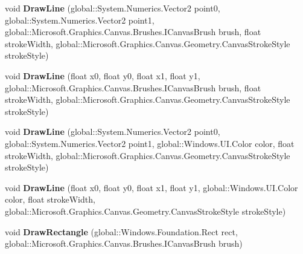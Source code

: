 \begin{DoxyCompactItemize}
\item 
\mbox{\label{interface_microsoft_1_1_graphics_1_1_canvas_1_1_i_canvas_drawing_session_a7127eba36145630ee36730eeffcc1427}} 
void {\bfseries Draw\+Line} (global\+::\+System.\+Numerics.\+Vector2 point0, global\+::\+System.\+Numerics.\+Vector2 point1, global\+::\+Microsoft.\+Graphics.\+Canvas.\+Brushes.\+I\+Canvas\+Brush brush, float stroke\+Width, global\+::\+Microsoft.\+Graphics.\+Canvas.\+Geometry.\+Canvas\+Stroke\+Style stroke\+Style)
\item 
\mbox{\label{interface_microsoft_1_1_graphics_1_1_canvas_1_1_i_canvas_drawing_session_a2d08811c378c0cbcef05802c8158558a}} 
void {\bfseries Draw\+Line} (float x0, float y0, float x1, float y1, global\+::\+Microsoft.\+Graphics.\+Canvas.\+Brushes.\+I\+Canvas\+Brush brush, float stroke\+Width, global\+::\+Microsoft.\+Graphics.\+Canvas.\+Geometry.\+Canvas\+Stroke\+Style stroke\+Style)
\item 
\mbox{\label{interface_microsoft_1_1_graphics_1_1_canvas_1_1_i_canvas_drawing_session_aa5127f84e2842c65de826b2860fc4f90}} 
void {\bfseries Draw\+Line} (global\+::\+System.\+Numerics.\+Vector2 point0, global\+::\+System.\+Numerics.\+Vector2 point1, global\+::\+Windows.\+U\+I.\+Color color, float stroke\+Width, global\+::\+Microsoft.\+Graphics.\+Canvas.\+Geometry.\+Canvas\+Stroke\+Style stroke\+Style)
\item 
\mbox{\label{interface_microsoft_1_1_graphics_1_1_canvas_1_1_i_canvas_drawing_session_a6dcbc5a2a7687014bbfb5e21dc5a5041}} 
void {\bfseries Draw\+Line} (float x0, float y0, float x1, float y1, global\+::\+Windows.\+U\+I.\+Color color, float stroke\+Width, global\+::\+Microsoft.\+Graphics.\+Canvas.\+Geometry.\+Canvas\+Stroke\+Style stroke\+Style)
\item 
\mbox{\label{interface_microsoft_1_1_graphics_1_1_canvas_1_1_i_canvas_drawing_session_a419ba76dbcf82a43653f83466e367260}} 
void {\bfseries Draw\+Rectangle} (global\+::\+Windows.\+Foundation.\+Rect rect, global\+::\+Microsoft.\+Graphics.\+Canvas.\+Brushes.\+I\+Canvas\+Brush brush)

\end{DoxyCompactItemize}
